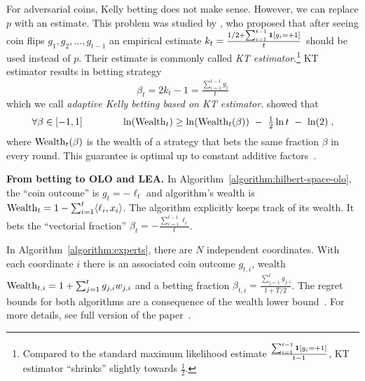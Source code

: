 For adversarial coins, Kelly betting does not make sense. However, we can
replace $p$ with an estimate. This problem was studied by
\citet{Krichevsky-Trofimov-1981}, who proposed that after seeing coin flips
$g_1, g_2, \dots, g_{t-1}$ an empirical estimate $k_t = \frac{1/2 +
\sum_{i=1}^{t-1} \mathbf{1}[g_i = +1]}{t}$ should be used instead of $p$. Their
estimate is commonly called \emph{KT estimator}.\footnote{Compared to the
standard maximum likelihood estimate $\frac{\sum_{i=1}^{t-1} \mathbf{1}[g_i =
+1]}{t-1}$, KT estimator ``shrinks'' slightly towards $\frac{1}{2}$.} KT
estimator results in betting strategy
\begin{equation}
\label{equation:kt-estimator-betting-strategy}
\beta_t = 2k_t - 1 = \tfrac{\sum_{i=1}^{t-1} g_i}{t}
\end{equation}
which we call \emph{adaptive Kelly betting based on KT estimator}.
\citeauthor{Krichevsky-Trofimov-1981} showed that
\begin{equation}
\label{equation:wealth-lower-bound}
\forall \beta \in [-1,1] \qquad \qquad \ln(\operatorname{Wealth}_t) \ge \ln(\operatorname{Wealth}_t(\beta)) \ - \ \tfrac{1}{2} \ln t \ - \ \ln(2) \; ,
\end{equation}
where $\operatorname{Wealth}_t(\beta)$ is the wealth of a strategy that bets the same
fraction $\beta$ in every round. This guarantee is optimal up to constant
additive factors~\citep{Cesa-Bianchi-Lugosi-2006}.

\textbf{From betting to \ac{OLO} and \ac{LEA}.}
In Algorithm~\ref{algorithm:hilbert-space-olo}, the ``coin outcome'' is
$g_t = -\ell_t$ and algorithm's wealth is
$
\operatorname{Wealth}_t = 1 - \sum_{i=1}^t \langle \ell_i, x_i \rangle
$.
The algorithm explicitly keeps track of its wealth. It bets the ``vectorial fraction''
$
\beta_t = - \tfrac{\sum_{i=1}^{t-1} \ell_i}{t}
$.

In Algorithm~\ref{algorithm:experts}, there are $N$ independent coordinates.
With each coordinate $i$ there is an associated coin outcome $g_{t,i}$, wealth
$
\operatorname{Wealth}_{t,i} = 1 + \sum_{j=1}^t g_{j,i} w_{j,i}
$
and a betting fraction
$
\beta_{t,i} = \tfrac{\sum_{j=1}^t g_{j,i}}{t + T/2}
$.
The regret bounds for both algorithms are a consequence of the wealth lower
bound~\label{equation:wealth-lower-bound}.  For more details, see full version
of the paper~\citep{Orabona-Pal-2016-parameter-free}.
